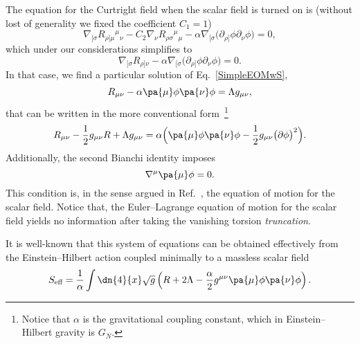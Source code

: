 \documentclass[aps,prl,twocolumn,superscriptaddress,showpacs,showkeys]{revtex4-1}
\begin{document}
The equation for the Curtright field when the scalar field is turned on is (without lost of generality we fixed the coefficient $C_1 = 1$)
\begin{equation*}
  \nabla_{[\sigma} R_{\rho]\mu}{}^{\mu}{}_\nu - {C_2} \nabla_\nu  R_{\rho\sigma}{}^{\mu}{}_\mu - \alpha \nabla_{[\sigma} \Big( \partial_{\rho]}\phi \partial_\nu\phi \Big) = 0,
\end{equation*}
which under our considerations simplifies to 
\begin{equation}
  \nabla_{[\sigma} R_{\rho]\nu} - \alpha \nabla_{[\sigma} \Big( \partial_{\rho]}\phi \partial_\nu\phi \Big) = 0.
  \label{SimpleEOMwS}
\end{equation}
In that case, we find a particular solution of Eq.~\eqref{SimpleEOMwS},%
\begin{equation*}
  R_{\mu\nu} - \alpha \pa{\mu} \phi \pa{\nu} \phi = \Lambda g_{\mu\nu},
\end{equation*}
that can be written in the more conventional form~\footnote{Notice that $\alpha$ is the gravitational coupling constant, which in Einstein--Hilbert gravity is $G_N$.}
\begin{equation}
  R_{\mu\nu} - \frac{1}{2} g_{\mu\nu} R + \Lambda g_{\mu\nu} = \alpha \Big( \pa{\mu} \phi \pa{\nu} \phi - \frac{1}{2} g_{\mu\nu} \big( \partial\phi \big)^2 \Big).
\end{equation}
Additionally, the second Bianchi identity imposes
\begin{equation}
  \nabla^\mu \pa{\mu} \phi = 0.
\end{equation}
This condition is, in the sense argued in Ref.~\cite{Bekenstein:2014uwa}, the equation of motion for the scalar field. Notice that, the Euler--Lagrange equation of motion for the scalar field yields no information after taking the vanishing torsion \emph{truncation}.

It is well-known that this system of equations can be obtained effectively from the Einstein--Hilbert action coupled minimally to a massless scalar field
\begin{equation}
  S_{\text{eff}} = \frac{1}{\alpha} \int \dn{4}{x} \sqrt{g} \left( R + 2 \Lambda - \frac{\alpha}{2} g^{\mu\nu} \pa{\mu}\phi \pa{\nu} \phi \right).
\end{equation}
\end{document}
